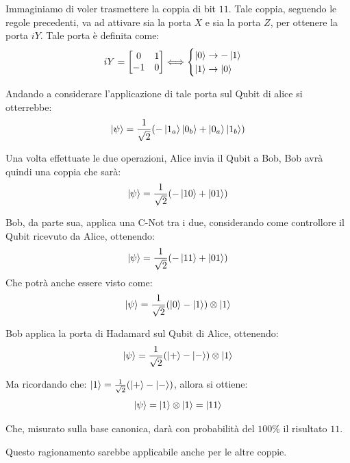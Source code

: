 Immaginiamo di voler trasmettere la coppia di bit \(11\). Tale coppia, seguendo le regole precedenti, va ad attivare sia la porta \(X\) e sia la porta \(Z\), per ottenere la porta \(iY\). Tale porta è definita come:
\[
iY =
\begin{bmatrix}
0 & 1 \\
-1 & 0
\end{bmatrix}
\Longleftrightarrow
\begin{cases}
\ket{0} \rightarrow - \ket{1} \\
\ket{1} \rightarrow \ket{0}
\end{cases}
\]

Andando a considerare l'applicazione di tale porta sul Qubit di alice si otterrebbe:
\[
\ket{\psi} = \frac{1}{\sqrt{2}}(-\ket{1_a} \ket{0_b} + \ket{0_a}\ket{1_b})
\]

Una volta effettuate le due operazioni, Alice invia il Qubit a Bob, Bob avrà quindi una coppia che sarà:
\[
\ket{\psi} = \frac{1}{\sqrt{2}} (-\ket{10}+\ket{01})
\]

Bob, da parte sua, applica una C-Not tra i due, considerando come controllore il Qubit ricevuto da Alice, ottenendo:
\[
\ket{\psi} = \frac{1}{\sqrt{2}} (-\ket{11} + \ket{01})
\]
Che potrà anche essere visto come:
\[
\ket{\psi}= \frac{1}{\sqrt{2}} (\ket{0} - \ket{1}) \otimes \ket{1}
\]

Bob applica la porta di Hadamard sul Qubit di Alice, ottenendo:
\[
\ket{\psi} = \frac{1}{\sqrt{2}}(\ket{+} - \ket{-}) \otimes \ket{1}
\]

Ma ricordando che: \(\ket{1} = \frac{1}{\sqrt{2}}(\ket{+} - \ket{-})\), allora si ottiene:
\[
\ket{\psi} = \ket{1} \otimes \ket{1} = \ket{11}
\]

Che, misurato sulla base canonica, darà con probabilità del \(100 \%\) il risultato \(11\). 

Questo ragionamento sarebbe applicabile anche per le altre coppie.